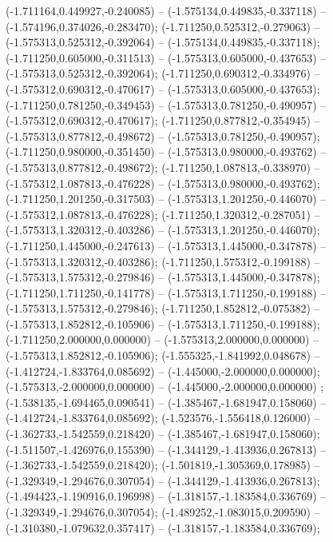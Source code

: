  (-1.711164,0.449927,-0.240085) -- (-1.575134,0.449835,-0.337118) -- (-1.574196,0.374026,-0.283470);
 (-1.711250,0.525312,-0.279063) -- (-1.575313,0.525312,-0.392064) -- (-1.575134,0.449835,-0.337118);
 (-1.711250,0.605000,-0.311513) -- (-1.575313,0.605000,-0.437653) -- (-1.575313,0.525312,-0.392064);
 (-1.711250,0.690312,-0.334976) -- (-1.575312,0.690312,-0.470617) -- (-1.575313,0.605000,-0.437653);
 (-1.711250,0.781250,-0.349453) -- (-1.575313,0.781250,-0.490957) -- (-1.575312,0.690312,-0.470617);
 (-1.711250,0.877812,-0.354945) -- (-1.575313,0.877812,-0.498672) -- (-1.575313,0.781250,-0.490957);
 (-1.711250,0.980000,-0.351450) -- (-1.575313,0.980000,-0.493762) -- (-1.575313,0.877812,-0.498672);
 (-1.711250,1.087813,-0.338970) -- (-1.575312,1.087813,-0.476228) -- (-1.575313,0.980000,-0.493762);
 (-1.711250,1.201250,-0.317503) -- (-1.575313,1.201250,-0.446070) -- (-1.575312,1.087813,-0.476228);
 (-1.711250,1.320312,-0.287051) -- (-1.575313,1.320312,-0.403286) -- (-1.575313,1.201250,-0.446070);
 (-1.711250,1.445000,-0.247613) -- (-1.575313,1.445000,-0.347878) -- (-1.575313,1.320312,-0.403286);
 (-1.711250,1.575312,-0.199188) -- (-1.575313,1.575312,-0.279846) -- (-1.575313,1.445000,-0.347878);
 (-1.711250,1.711250,-0.141778) -- (-1.575313,1.711250,-0.199188) -- (-1.575313,1.575312,-0.279846);
 (-1.711250,1.852812,-0.075382) -- (-1.575313,1.852812,-0.105906) -- (-1.575313,1.711250,-0.199188);
 (-1.711250,2.000000,0.000000) -- (-1.575313,2.000000,0.000000) -- (-1.575313,1.852812,-0.105906);
 (-1.555325,-1.841992,0.048678) -- (-1.412724,-1.833764,0.085692) -- (-1.445000,-2.000000,0.000000);
 (-1.575313,-2.000000,0.000000) -- (-1.445000,-2.000000,0.000000) ;
 (-1.538135,-1.694465,0.090541) -- (-1.385467,-1.681947,0.158060) -- (-1.412724,-1.833764,0.085692);
 (-1.523576,-1.556418,0.126000) -- (-1.362733,-1.542559,0.218420) -- (-1.385467,-1.681947,0.158060);
 (-1.511507,-1.426976,0.155390) -- (-1.344129,-1.413936,0.267813) -- (-1.362733,-1.542559,0.218420);
 (-1.501819,-1.305369,0.178985) -- (-1.329349,-1.294676,0.307054) -- (-1.344129,-1.413936,0.267813);
 (-1.494423,-1.190916,0.196998) -- (-1.318157,-1.183584,0.336769) -- (-1.329349,-1.294676,0.307054);
 (-1.489252,-1.083015,0.209590) -- (-1.310380,-1.079632,0.357417) -- (-1.318157,-1.183584,0.336769);
